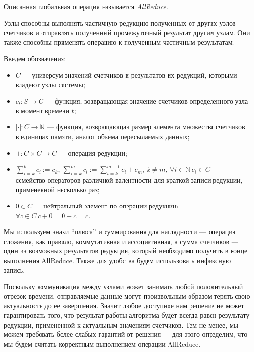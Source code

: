 \begin{definition}
    Описанная глобальная операция называется \textit{AllReduce}.
\end{definition}

Узлы способны выполнять частичную редукцию полученных от других узлов счетчиков и отправлять полученный промежуточный результат другим узлам. Они также способны применять операцию к полученным частичным результатам.

\begin{definition}
    Введем обозначения:
    \begin{itemize}
        \item $C$ --- универсум значений счетчиков и результатов их редукций, которыми владеют узлы системы;
        \item $c_t \colon S \to C$ --- функция, возвращающая значение счетчиков определенного узла в момент времени $t$;
        \item $|\cdot| \colon C \to \mathbb{N}$ --- функция, возвращающая размер элемента множества счетчиков в единицах памяти, аналог объема пересылаемых данных;
        \item $+ \colon C \times C \to C$ --- операция редукции;
        \item $\displaystyle \sum_{i = k}^k c_i := c_k,\ \displaystyle \sum_{i = k}^m c_i := \displaystyle \sum_{i = k}^{m - 1} c_i + c_m,\ k \neq m,\ \forall i \in \mathbb{N}\ c_i \in C$ --- семейство операторов различной валентности для краткой записи редукции, примененной несколько раз;
        \item $0 \in C$ --- нейтральный элемент по операции редукции: $\forall c \in C\ c + 0 = 0 + c = c$.
    \end{itemize}
\end{definition}

Мы используем знаки \enquote{плюса} и суммирования для наглядности --- операция сложения, как правило, коммутативная и ассоциативная, а сумма счетчиков --- один из возможных результатов редукции, который необходимо получить в конце выполнения AllReduce. Также для удобства будем использовать инфиксную запись.

Поскольку коммуникация между узлами может занимать любой положительный отрезок времени, отправляемые данные могут произвольным образом терять свою актуальность до ее завершения. Значит любое доступное нам решение не может гарантировать того, что результат работы алгоритма будет всегда равен результату редукции, примененной к актуальным значениям счетчиков. Тем не менее, мы можем требовать более слабых гарантий от решения --- для этого определим, что мы будем считать корректным выполнением операции AllReduce.

